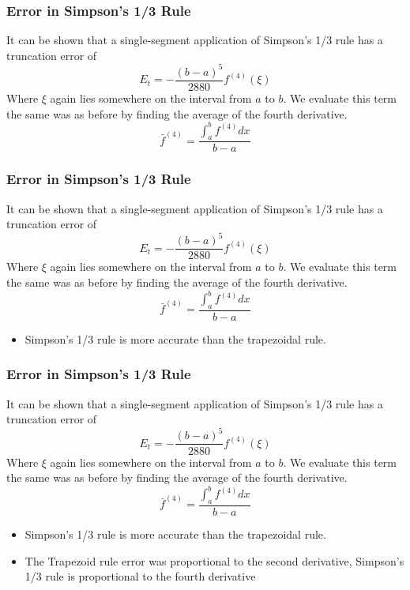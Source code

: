 \documentclass{if-beamer}
\begin{document}
\begin{frame}
	\frametitle{Error in Simpson's 1/3 Rule}
	It can be shown that a single-segment application of Simpson’s 1/3 rule has a truncation error of 
	$$E_t = -\frac{(b-a)^5}{2880}f^{(4)}(\xi)$$
	Where $\xi$ again lies somewhere on the interval from $a$ to $b$. We evaluate this term the same was as before by finding the average of the fourth derivative.
	$$ \bar{f}^{(4)} = \frac{\int_{a}^{b}f^{(4)}dx}{b-a}$$
\end{frame}

\begin{frame}
	\frametitle{Error in Simpson's 1/3 Rule}
	It can be shown that a single-segment application of Simpson’s 1/3 rule has a truncation error of 
	$$E_t = -\frac{(b-a)^5}{2880}f^{(4)}(\xi)$$
	Where $\xi$ again lies somewhere on the interval from $a$ to $b$.  We evaluate this term the same was as before by finding the average of the fourth derivative.
	$$ \bar{f}^{(4)} = \frac{\int_{a}^{b}f^{(4)}dx}{b-a}$$
	\begin{itemize}
		\item Simpson’s 1/3 rule is more accurate than the trapezoidal rule.
	\end{itemize}
\end{frame}

\begin{frame}
	\frametitle{Error in Simpson's 1/3 Rule}
	It can be shown that a single-segment application of Simpson’s 1/3 rule has a truncation error of 
	$$E_t = -\frac{(b-a)^5}{2880}f^{(4)}(\xi)$$
	Where $\xi$ again lies somewhere on the interval from $a$ to $b$. We evaluate this term the same was as before by finding the average of the fourth derivative.
	$$ \bar{f}^{(4)} = \frac{\int_{a}^{b}f^{(4)}dx}{b-a}$$
	\begin{itemize}
		\item Simpson’s 1/3 rule is more accurate than the trapezoidal rule.
		\item The Trapezoid rule error was proportional to the second derivative, Simpson's 1/3 rule is proportional to the fourth derivative
	\end{itemize}
\end{frame}
\end{document}
